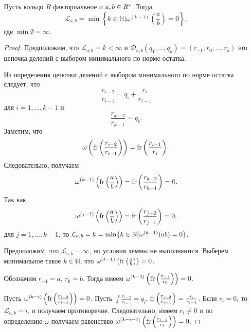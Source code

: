 \documentclass[_00_dissertation.tex]{subfiles}
\begin{document}
\begin{lemma}\label{lemma:euclidean_algorithm_and_minima}
    Пусть кольцо $R$ факториальное и $a, b \in R^{*}$.
    Тогда
    \begin{equation*}
        \mathcal{L}_{a, b} = \min\left\{
            k \in \mathbb{N} \Big| \omega^{(k-1)}\left(\frac{a}{b}\right) = 0
        \right\},
    \end{equation*}
    где $\min \emptyset = \infty$.
\end{lemma}
\begin{proof}
    Предположим, что $\mathcal{L}_{a, b} = k < \infty$ и $\mathcal{D}_{a, b}(q_1, \dots, q_k) = (r_{-1}, r_0, \dots, r_k)$ это цепочка делений с выбором минимального по норме остатка.

    Из определения цепочки делений с выбором минимального по норме остатка следует, что
    \begin{equation*}
        \frac{r_{i-2}}{r_{i-1}} = q_i + \frac{r_i}{r_{i-1}}
    \end{equation*}
    для $i = 1, \dots, k-1$ и
    \begin{equation*}
        \frac{r_{k-2}}{r_{k-1}} = q_k.
    \end{equation*}
    Заметим, что
    \begin{equation*}
        \omega\left(
            \textrm{fr}\left(\frac{r_{i-2}}{r_{i-1}}\right)
        \right) = \textrm{fr}\left(\frac{r_{i-1}}{r_i}\right).
    \end{equation*}
    Следовательно, получаем
    \begin{equation*}
        \omega^{(k-1)}\left(
            \textrm{fr}\left(\frac{a}{b}\right)
        \right) = \textrm{fr}\left(\frac{r_{k-2}}{r_{k-1}}\right) = 0.
    \end{equation*}
    Так как
    \begin{equation*}
        \omega^{(j-1)}\left(
            \textrm{fr}\left(\frac{a}{b}\right)
        \right) = \textrm{fr}\left(\frac{r_{j-2}}{r_{j-1}}\right) = 0,
    \end{equation*}
    для $j = 1, \dots, k-1$, то $\mathcal{L}_{a, b} = k = \min\{k \in \mathbb{N} \big| \omega^{(k-1)}(a\/b) = 0\}$.

    Предположим, что $\mathcal{L}_{a, b} = \infty$, но условия леммы не выполняются.
    Выберем минимальное такое $k \in \mathbb{N}$, что $\omega^{(k-1)}\left(\textrm{fr}\left(\frac{a}{b}\right)\right) = 0$.

    Обозначим $r_{-1} = a$, $r_0 = b$.
    Тогда имеем $\omega^{(k-1)}\left(\textrm{fr}\left(\frac{r_{-1}}{r_0}\right)\right) = 0$.

    Пусть $\omega^{(k-i)}\left(\textrm{fr}\left(\frac{r_{i-2}}{r_{i-1}}\right)\right) = 0$.
    Пусть $\int{\frac{r_{i-2}}{r_{i-1}}} = q_i$, $\textrm{fr}\left(\frac{r_{i-2}}{r_{i-1}}\right) = \frac{r_i}{r_{i-1}}$.
    Если $r_i = 0$, то $\mathcal{L}_{a, b} = i$, и получаем противоречие.
    Следовательно, имеем $r_i \neq 0$ и по определению $\omega$ получаем равенствво $\omega^{(k-i-1)}\left(\textrm{fr}\left(\frac{r_{i-1}}{r_i}\right)\right) = 0$.


\end{proof}
\end{document}
